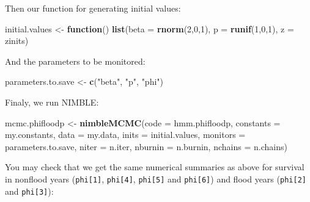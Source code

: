 \documentclass[
  12pt,
]{krantz}
\newenvironment{Shaded}{\begin{snugshade}}{\end{snugshade}}
\newcommand{\AttributeTok}[1]{\textcolor[rgb]{0.13,0.29,0.53}{#1}}
\newcommand{\ControlFlowTok}[1]{\textcolor[rgb]{0.13,0.29,0.53}{\textbf{#1}}}
\newcommand{\DecValTok}[1]{\textcolor[rgb]{0.00,0.00,0.81}{#1}}
\newcommand{\FunctionTok}[1]{\textcolor[rgb]{0.13,0.29,0.53}{\textbf{#1}}}
\newcommand{\NormalTok}[1]{#1}
\newcommand{\OtherTok}[1]{\textcolor[rgb]{0.56,0.35,0.01}{#1}}
\newcommand{\StringTok}[1]{\textcolor[rgb]{0.31,0.60,0.02}{#1}}
\begin{document}
Then our function for generating initial values:

\begin{Shaded}
\begin{Highlighting}[]
\NormalTok{initial.values }\OtherTok{\textless{}{-}} \ControlFlowTok{function}\NormalTok{() }\FunctionTok{list}\NormalTok{(}\AttributeTok{beta =} \FunctionTok{rnorm}\NormalTok{(}\DecValTok{2}\NormalTok{,}\DecValTok{0}\NormalTok{,}\DecValTok{1}\NormalTok{),}
                                  \AttributeTok{p =} \FunctionTok{runif}\NormalTok{(}\DecValTok{1}\NormalTok{,}\DecValTok{0}\NormalTok{,}\DecValTok{1}\NormalTok{),}
                                  \AttributeTok{z =}\NormalTok{ zinits)}
\end{Highlighting}
\end{Shaded}

And the parameters to be monitored:

\begin{Shaded}
\begin{Highlighting}[]
\NormalTok{parameters.to.save }\OtherTok{\textless{}{-}} \FunctionTok{c}\NormalTok{(}\StringTok{"beta"}\NormalTok{, }\StringTok{"p"}\NormalTok{, }\StringTok{"phi"}\NormalTok{)}
\end{Highlighting}
\end{Shaded}

Finaly, we run NIMBLE:

\begin{Shaded}
\begin{Highlighting}[]
\NormalTok{mcmc.phifloodp }\OtherTok{\textless{}{-}} \FunctionTok{nimbleMCMC}\NormalTok{(}\AttributeTok{code =}\NormalTok{ hmm.phifloodp, }
                             \AttributeTok{constants =}\NormalTok{ my.constants,}
                             \AttributeTok{data =}\NormalTok{ my.data,              }
                             \AttributeTok{inits =}\NormalTok{ initial.values,}
                             \AttributeTok{monitors =}\NormalTok{ parameters.to.save,}
                             \AttributeTok{niter =}\NormalTok{ n.iter,}
                             \AttributeTok{nburnin =}\NormalTok{ n.burnin, }
                             \AttributeTok{nchains =}\NormalTok{ n.chains)}
\end{Highlighting}
\end{Shaded}

You may check that we get the same numerical summaries as above for survival in nonflood years (\texttt{phi{[}1{]}}, \texttt{phi{[}4{]}}, \texttt{phi{[}5{]}} and \texttt{phi{[}6{]}}) and flood years (\texttt{phi{[}2{]}} and \texttt{phi{[}3{]}}):
\end{document}
